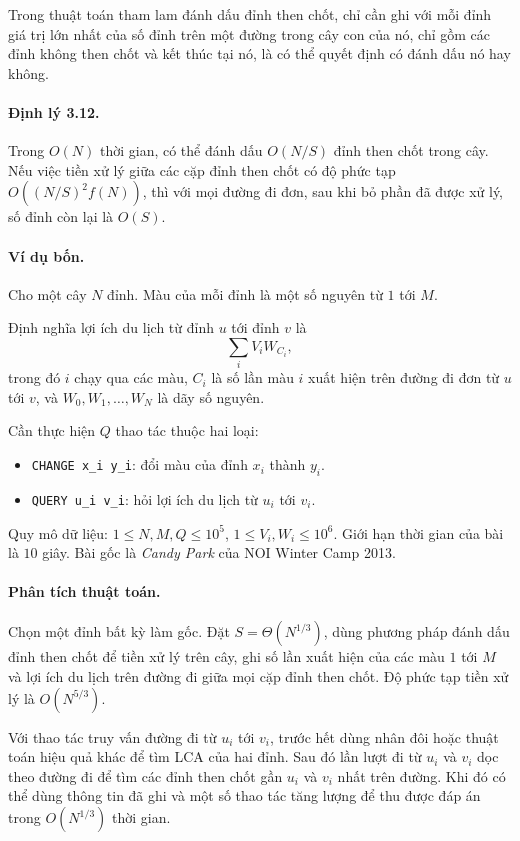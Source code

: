 \documentclass[11pt]{article}
\begin{document}
Trong thuật toán tham lam đánh dấu đỉnh then chốt, chỉ cần ghi với mỗi đỉnh
giá trị lớn nhất của số đỉnh trên một đường trong cây con của nó, chỉ gồm các
đỉnh không then chốt và kết thúc tại nó, là có thể quyết định có đánh dấu nó
hay không.

\paragraph{Định lý 3.12.}
Trong \(O(N)\) thời gian, có thể đánh dấu \(O(N/S)\) đỉnh then chốt trong
cây. Nếu việc tiền xử lý giữa các cặp đỉnh then chốt có độ phức tạp
\(O((N/S)^2f(N))\), thì với mọi đường đi đơn, sau khi bỏ phần đã được xử lý,
số đỉnh còn lại là \(O(S)\).

\paragraph{Ví dụ bốn.}
Cho một cây \(N\) đỉnh. Màu của mỗi đỉnh là một số nguyên từ \(1\) tới \(M\).

Định nghĩa lợi ích du lịch từ đỉnh \(u\) tới đỉnh \(v\) là
\[
  \sum_i V_i W_{C_i},
\]
trong đó \(i\) chạy qua các màu, \(C_i\) là số lần màu \(i\) xuất hiện trên
đường đi đơn từ \(u\) tới \(v\), và \(W_0,W_1,\ldots,W_N\) là dãy số nguyên.

Cần thực hiện \(Q\) thao tác thuộc hai loại:
\begin{itemize}
  \item \texttt{CHANGE x\_i y\_i}: đổi màu của đỉnh \(x_i\) thành \(y_i\).
  \item \texttt{QUERY u\_i v\_i}: hỏi lợi ích du lịch từ \(u_i\) tới
  \(v_i\).
\end{itemize}

Quy mô dữ liệu: \(1\le N,M,Q\le 10^5\), \(1\le V_i,W_i\le 10^6\). Giới hạn
thời gian của bài là \(10\) giây. Bài gốc là \emph{Candy Park} của NOI
Winter Camp 2013.

\paragraph{Phân tích thuật toán.}
Chọn một đỉnh bất kỳ làm gốc. Đặt \(S=\Theta(N^{1/3})\), dùng phương pháp
đánh dấu đỉnh then chốt để tiền xử lý trên cây, ghi số lần xuất hiện của các
màu \(1\) tới \(M\) và lợi ích du lịch trên đường đi giữa mọi cặp đỉnh then
chốt. Độ phức tạp tiền xử lý là \(O(N^{5/3})\).

Với thao tác truy vấn đường đi từ \(u_i\) tới \(v_i\), trước hết dùng nhân đôi
hoặc thuật toán hiệu quả khác để tìm LCA của hai đỉnh. Sau đó lần lượt đi từ
\(u_i\) và \(v_i\) dọc theo đường đi để tìm các đỉnh then chốt gần \(u_i\) và
\(v_i\) nhất trên đường. Khi đó có thể dùng thông tin đã ghi và một số thao
tác tăng lượng để thu được đáp án trong \(O(N^{1/3})\) thời gian.
\end{document}

